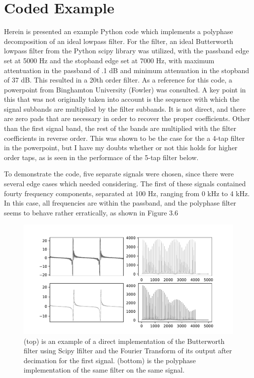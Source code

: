 \documentclass{report}
\begin{document}
\section{Coded Example}

Herein is presented an example Python code which implements a polyphase decomposition of an ideal lowpass filter.  For the filter, an ideal Butterworth lowpass filter from the Python scipy library was utilized, with the passband edge set at 5000 Hz and the stopband edge set at 7000 Hz, with maximum attentuation in the passband of .1 dB and minimum attenuation in the stopband of 37 dB.  This resulted in a 20th order filter.  As a reference for this code, a powerpoint from Binghamton University (Fowler) was consulted.  A key point in this that was not originally taken into account is the sequence with which the signal subbands are multiplied by the filter subbands.  It is not direct, and there are zero pads that are necessary in order to recover the proper coefficients.  Other than the first signal band, the rest of the bands are multiplied with the filter coefficients in reverse order.  This was shown to be the case for the a 4-tap filter in the powerpoint, but I have my doubts whether or not this holds for higher order taps, as is seen in the performace of the 5-tap filter below.

To demonstrate the code, five separate signals were chosen, since there were several edge cases which needed considering.  The first of these signals contained fourty frequency components, separated at 100 Hz, ranging from 0 kHz to 4 kHz. In this case, all frequencies are within the passband, and the polyphase filter seems to behave rather erratically, as shown in Figure 3.6

\begin{figure}[ht!]
\includegraphics[scale=.6]{Figure_6.pdf}
\caption{(top) is an example of a direct implementation of the Butterworth filter using Scipy lfilter and the Fourier Transform of its output after decimation for the first signal. (bottom) is the polyphase implementation of the same filter on the same signal.}
\end{figure} 
\end{document}
